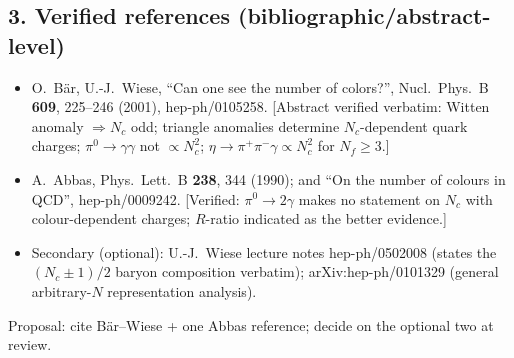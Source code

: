 \subsection*{3. Verified references (bibliographic/abstract-level)}
\begin{itemize}
  \item O.~B\"ar, U.-J.~Wiese, ``Can one see the number of
    colors?'', Nucl.\ Phys.\ B \textbf{609}, 225--246 (2001),
    hep-ph/0105258. [Abstract verified verbatim: Witten anomaly
    $\Rightarrow N_c$ odd; triangle anomalies determine
    $N_c$-dependent quark charges; $\pi^0\to\gamma\gamma$ not
    $\propto N_c^2$; $\eta\to\pi^+\pi^-\gamma\propto N_c^2$ for
    $N_f\ge3$.]
  \item A.~Abbas, Phys.\ Lett.\ B \textbf{238}, 344 (1990); and
    ``On the number of colours in QCD'', hep-ph/0009242.
    [Verified: $\pi^0\to2\gamma$ makes no statement on $N_c$ with
    colour-dependent charges; $R$-ratio indicated as the better
    evidence.]
  \item Secondary (optional): U.-J.~Wiese lecture notes
    hep-ph/0502008 (states the $(N_c{\pm}1)/2$ baryon composition
    verbatim); arXiv:hep-ph/0101329 (general arbitrary-$N$
    representation analysis).
\end{itemize}
Proposal: cite B\"ar--Wiese + one Abbas reference; decide on the
optional two at review.

